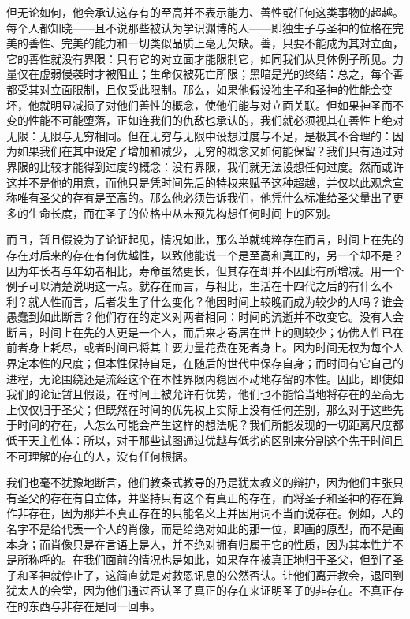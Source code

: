 但无论如何，他会承认这存有的至高并不表示能力、善性或任何这类事物的超越。每个人都知晓——且不说那些被认为学识渊博的人——即独生子与圣神的位格在完美的善性、完美的能力和一切类似品质上毫无欠缺。善，只要不能成为其对立面，它的善性就没有界限：只有它的对立面才能限制它，如同我们从具体例子所见。力量仅在虚弱侵袭时才被阻止；生命仅被死亡所限；黑暗是光的终结：总之，每个善都受其对立面限制，且仅受此限制。那么，如果他假设独生子和圣神的性能会变坏，他就明显减损了对他们善性的概念，使他们能与对立面关联。但如果神圣而不变的性能不可能堕落，正如连我们的仇敌也承认的，我们就必须视其在善性上绝对无限：无限与无穷相同。但在无穷与无限中设想过度与不足，是极其不合理的：因为如果我们在其中设定了增加和减少，无穷的概念又如何能保留？我们只有通过对界限的比较才能得到过度的概念：没有界限，我们就无法设想任何过度。然而或许这并不是他的用意，而他只是凭时间先后的特权来赋予这种超越，并仅以此观念宣称唯有圣父的存有是至高的。那么他必须告诉我们，他凭什么标准给圣父量出了更多的生命长度，而在圣子的位格中从未预先构想任何时间上的区别。\par

而且，暂且假设为了论证起见，情况如此，那么单就纯粹存在而言，时间上在先的存在对后来的存在有何优越性，以致他能说一个是至高和真正的，另一个却不是？因为年长者与年幼者相比，寿命虽然更长，但其存在却并不因此有所增减。用一个例子可以清楚说明这一点。就存在而言，与相比，生活在十四代之后的有什么不利？就人性而言，后者发生了什么变化？他因时间上较晚而成为较少的人吗？谁会愚蠢到如此断言？他们存在的定义对两者相同：时间的流逝并不改变它。没有人会断言，时间上在先的人更是一个人，而后来才寄居在世上的则较少；仿佛人性已在前者身上耗尽，或者时间已将其主要力量花费在死者身上。因为时间无权为每个人界定本性的尺度；但本性保持自足，在随后的世代中保存自身；而时间有它自己的进程，无论围绕还是流经这个在本性界限内稳固不动地存留的本性。因此，即使如我们的论证暂且假设，在时间上被允许有优势，他们也不能恰当地将存在的至高无上仅仅归于圣父；但既然在时间的优先权上实际上没有任何差别，那么对于这些先于时间的存在，人怎么可能会产生这样的想法呢？我们所能发现的一切距离尺度都低于天主性体：所以，对于那些试图通过优越与低劣的区别来分割这个先于时间且不可理解的存在的人，没有任何根据。\par

我们也毫不犹豫地断言，他们教条式教导的乃是犹太教义的辩护，因为他们主张只有圣父的存在有自立体，并坚持只有这个有真正的存在，而将圣子和圣神的存在算作非存在，因为那并不真正存在的只能名义上并因用词不当而说存在。例如，人的名字不是给代表一个人的肖像，而是给绝对如此的那一位，即画的原型，而不是画本身；而肖像只是在言语上是人，并不绝对拥有归属于它的性质，因为其本性并不是所称呼的。在我们面前的情况也是如此，如果存在被真正地归于圣父，但到了圣子和圣神就停止了，这简直就是对救恩讯息的公然否认。让他们离开教会，退回到犹太人的会堂，因为他们通过否认圣子真正的存在来证明圣子的非存在。不真正存在的东西与非存在是同一回事。\par

